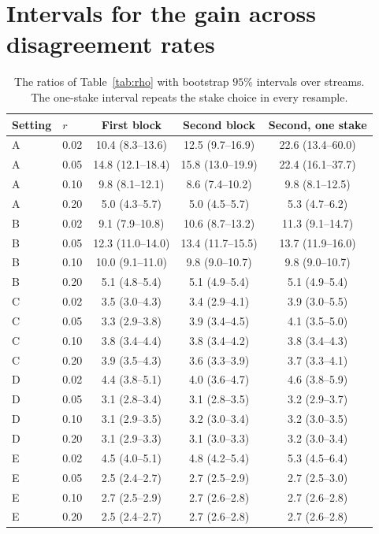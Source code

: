 \appendix
\section{Intervals for the gain across disagreement rates}

\begin{table}[!h]
\centering\small
\caption{The ratios of Table~\ref{tab:rho} with bootstrap $95\%$ intervals over streams. The one-stake interval repeats the stake choice in every resample.}
\label{tab:rhoci}
\begin{tabular}{llccc}
\toprule
Setting & $r$ & First block & Second block & Second, one stake \\
\midrule
A & 0.02 & 10.4 (8.3--13.6) & 12.5 (9.7--16.9) & 22.6 (13.4--60.0) \\
A & 0.05 & 14.8 (12.1--18.4) & 15.8 (13.0--19.9) & 22.4 (16.1--37.7) \\
A & 0.10 & 9.8 (8.1--12.1) & 8.6 (7.4--10.2) & 9.8 (8.1--12.5) \\
A & 0.20 & 5.0 (4.3--5.7) & 5.0 (4.5--5.7) & 5.3 (4.7--6.2) \\
\addlinespace
B & 0.02 & 9.1 (7.9--10.8) & 10.6 (8.7--13.2) & 11.3 (9.1--14.7) \\
B & 0.05 & 12.3 (11.0--14.0) & 13.4 (11.7--15.5) & 13.7 (11.9--16.0) \\
B & 0.10 & 10.0 (9.1--11.0) & 9.8 (9.0--10.7) & 9.8 (9.0--10.7) \\
B & 0.20 & 5.1 (4.8--5.4) & 5.1 (4.9--5.4) & 5.1 (4.9--5.4) \\
\addlinespace
C & 0.02 & 3.5 (3.0--4.3) & 3.4 (2.9--4.1) & 3.9 (3.0--5.5) \\
C & 0.05 & 3.3 (2.9--3.8) & 3.9 (3.4--4.5) & 4.1 (3.5--5.0) \\
C & 0.10 & 3.8 (3.4--4.4) & 3.8 (3.4--4.2) & 3.8 (3.4--4.3) \\
C & 0.20 & 3.9 (3.5--4.3) & 3.6 (3.3--3.9) & 3.7 (3.3--4.1) \\
\addlinespace
D & 0.02 & 4.4 (3.8--5.1) & 4.0 (3.6--4.7) & 4.6 (3.8--5.9) \\
D & 0.05 & 3.1 (2.8--3.4) & 3.1 (2.8--3.5) & 3.2 (2.9--3.7) \\
D & 0.10 & 3.1 (2.9--3.5) & 3.2 (3.0--3.4) & 3.2 (3.0--3.5) \\
D & 0.20 & 3.1 (2.9--3.3) & 3.1 (3.0--3.3) & 3.2 (3.0--3.4) \\
\addlinespace
E & 0.02 & 4.5 (4.0--5.1) & 4.8 (4.2--5.4) & 5.3 (4.5--6.4) \\
E & 0.05 & 2.5 (2.4--2.7) & 2.7 (2.5--2.9) & 2.7 (2.5--3.0) \\
E & 0.10 & 2.7 (2.5--2.9) & 2.7 (2.6--2.8) & 2.7 (2.6--2.8) \\
E & 0.20 & 2.5 (2.4--2.7) & 2.7 (2.6--2.8) & 2.7 (2.6--2.8) \\
\bottomrule
\end{tabular}
\end{table}
